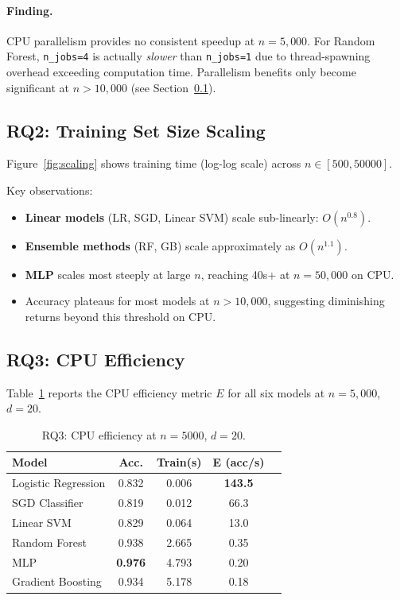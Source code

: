 \documentclass[10pt,twocolumn]{article}
\begin{document}
\paragraph{Finding.}
CPU parallelism provides no consistent speedup at $n=5{,}000$. 
For Random Forest, \texttt{n\_jobs=4} is actually \textit{slower} than 
\texttt{n\_jobs=1} due to thread-spawning overhead exceeding computation time. 
Parallelism benefits only become significant at $n > 10{,}000$ (see Section~\ref{sec:rq2}).

\subsection{RQ2: Training Set Size Scaling}
\label{sec:rq2}

Figure~\ref{fig:scaling} shows training time (log-log scale) across 
$n \in [500, 50000]$.

Key observations:
\begin{itemize}[nosep,leftmargin=*]
  \item \textbf{Linear models} (LR, SGD, Linear SVM) scale sub-linearly: $O(n^{0.8})$.
  \item \textbf{Ensemble methods} (RF, GB) scale approximately as $O(n^{1.1})$.
  \item \textbf{MLP} scales most steeply at large $n$, reaching 40s+ at $n=50{,}000$ on CPU.
  \item Accuracy plateaus for most models at $n > 10{,}000$, suggesting diminishing returns beyond this threshold on CPU.
\end{itemize}

\subsection{RQ3: CPU Efficiency}

Table~\ref{tab:efficiency} reports the CPU efficiency metric $E$ for all six models 
at $n=5{,}000$, $d=20$.

\begin{table}[h]
\centering
\caption{RQ3: CPU efficiency at $n=5000$, $d=20$.}
\label{tab:efficiency}
\small
\begin{tabular}{lcccc}
\toprule
\textbf{Model} & \textbf{Acc.} & \textbf{Train(s)} & \textbf{E (acc/s)} \\
\midrule
Logistic Regression  & 0.832 & 0.006  & \textbf{143.5} \\
SGD Classifier       & 0.819 & 0.012  & 66.3 \\
Linear SVM           & 0.829 & 0.064  & 13.0 \\
Random Forest        & 0.938 & 2.665  & 0.35 \\
MLP                  & \textbf{0.976} & 4.793  & 0.20 \\
Gradient Boosting    & 0.934 & 5.178  & 0.18 \\
\bottomrule
\end{tabular}
\end{table}
\end{document}

